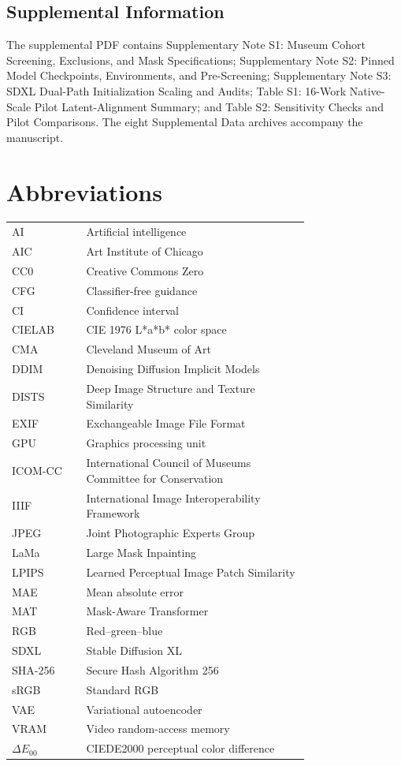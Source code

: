 \documentclass[fleqn,12pt,lineno]{wlpeerj}
\begin{document}
\subsection*{Supplemental Information}
The supplemental PDF contains Supplementary Note S1: Museum Cohort Screening, Exclusions, and Mask Specifications; Supplementary Note S2: Pinned Model Checkpoints, Environments, and Pre-Screening; Supplementary Note S3: SDXL Dual-Path Initialization Scaling and Audits; Table S1: 16-Work Native-Scale Pilot Latent-Alignment Summary; and Table S2: Sensitivity Checks and Pilot Comparisons. The eight Supplemental Data archives accompany the manuscript.

\section*{Abbreviations}
\noindent\begin{tabular}{@{}lp{0.75\linewidth}@{}}
AI & Artificial intelligence \\
AIC & Art Institute of Chicago \\
CC0 & Creative Commons Zero \\
CFG & Classifier-free guidance \\
CI & Confidence interval \\
CIELAB & CIE 1976 L*a*b* color space \\
CMA & Cleveland Museum of Art \\
DDIM & Denoising Diffusion Implicit Models \\
DISTS & Deep Image Structure and Texture Similarity \\
EXIF & Exchangeable Image File Format \\
GPU & Graphics processing unit \\
ICOM-CC & International Council of Museums Committee for Conservation \\
IIIF & International Image Interoperability Framework \\
JPEG & Joint Photographic Experts Group \\
LaMa & Large Mask Inpainting \\
LPIPS & Learned Perceptual Image Patch Similarity \\
MAE & Mean absolute error \\
MAT & Mask-Aware Transformer \\
RGB & Red–green–blue \\
SDXL & Stable Diffusion XL \\
SHA-256 & Secure Hash Algorithm 256 \\
sRGB & Standard RGB \\
VAE & Variational autoencoder \\
VRAM & Video random-access memory \\
\ensuremath{\Delta E_{00}} & CIEDE2000 perceptual color difference
\end{tabular}




\end{document}
